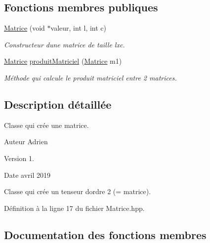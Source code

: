 \subsection*{Fonctions membres publiques}
\begin{DoxyCompactItemize}
\item 
\mbox{\label{class_matrice_aefac14911f8386860ddbac4c3a3c8812}} 
\hyperlink{class_matrice_aefac14911f8386860ddbac4c3a3c8812}{Matrice} (void $\ast$valeur, int l, int c)
\begin{DoxyCompactList}\small\item\em Constructeur d\textquotesingle{}une matrice de taille lxc. \end{DoxyCompactList}\item 
\hyperlink{class_matrice}{Matrice} \hyperlink{class_matrice_a80ddaeb41cd4e71cd2edd13c206c109d}{produit\+Matriciel} (\hyperlink{class_matrice}{Matrice} m1)
\begin{DoxyCompactList}\small\item\em Méthode qui calcule le produit matriciel entre 2 matrices. \end{DoxyCompactList}\end{DoxyCompactItemize}


\subsection{Description détaillée}
Classe qui crée une matrice. 

\begin{DoxyAuthor}{Auteur}
Adrien 
\end{DoxyAuthor}
\begin{DoxyVersion}{Version}
1. 
\end{DoxyVersion}
\begin{DoxyDate}{Date}
avril 2019
\end{DoxyDate}
Classe qui crée un tenseur d\textquotesingle{}ordre 2 (= matrice). 

Définition à la ligne 17 du fichier Matrice.\+hpp.



\subsection{Documentation des fonctions membres}
\mbox{\label{class_matrice_a80ddaeb41cd4e71cd2edd13c206c109d}} 
